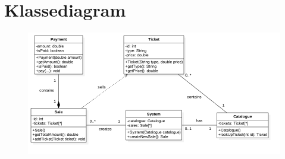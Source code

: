 \section{Klassediagram}
\begin{figure}[H]
    \begin{center}
        \includegraphics[width=1\textwidth]{Klassediagram.png}
    \end{center}
\end{figure}


